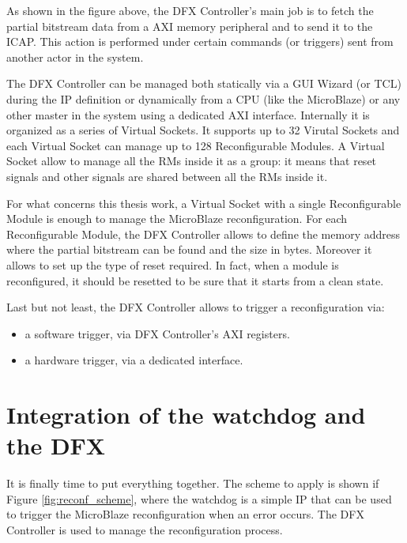 As shown in the figure above, the DFX Controller's main job is to fetch the partial bitstream data from a AXI memory peripheral and to send it to the ICAP. This action is performed under certain commands (or triggers) sent from another actor in the system.\bigskip

The DFX Controller can be managed both statically via a GUI Wizard (or TCL) during the IP definition or dynamically from a CPU (like the MicroBlaze) or any other master in the system using a dedicated AXI interface. Internally it is organized as a series of Virtual Sockets. It supports up to 32 Virutal Sockets and each Virtual Socket can manage up to 128 Reconfigurable Modules. A Virtual Socket allow to manage all the RMs inside it as a group: it means that reset signals and other signals are shared between all the RMs inside it. \bigskip

For what concerns this thesis work, a Virtual Socket with a single Reconfigurable Module is enough to manage the MicroBlaze reconfiguration. For each Reconfigurable Module, the DFX Controller allows to define the memory address where the partial bitstream can be found and the size in bytes. Moreover it allows to set up the type of reset required. In fact, when a module is reconfigured, it should be resetted to be sure that it starts from a clean state. \bigskip

Last but not least, the DFX Controller allows to trigger a reconfiguration via:
\begin{itemize}
    \item a software trigger, via DFX Controller's AXI registers.
    \item a hardware trigger, via a dedicated interface.
\end{itemize}

\section{Integration of the watchdog and the DFX}
It is finally time to put everything together. The scheme to apply is shown if Figure \ref{fig:reconf_scheme}, where the watchdog is a simple IP that can be used to trigger the MicroBlaze reconfiguration when an error occurs. The DFX Controller is used to manage the reconfiguration process. 

